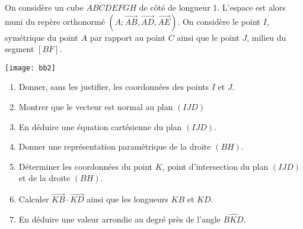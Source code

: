 \documentclass[11pt,fleqn, openany]{book} %
\begin{document}
\begin{exercise}
On considère un cube $ABCDEFGH$ de côté de longueur 1. L'espace est alors muni du repère orthonormé $(A;\overrightarrow{AB},\overrightarrow{AD},\overrightarrow{AE})$.
On considère le point $I$, symétrique du point $A$ par rapport au point $C$ ainsi que le point $J$, milieu du segment $[BF]$.

\begin{center}\texttt{[image: bb2]}\end{center}

\begin{enumerate}
    \item Donner, sans les justifier, les coordonnées des points $I$ et $J$.
    \item Montrer que le vecteur  est normal au plan $(IJD)$
    \item En déduire une équation cartésienne du plan $(IJD)$.
    \item Donner une représentation paramétrique de la droite $(BH)$.
    \item Déterminer les coordonnées du point $K$, point d'intersection du plan $(IJD)$ et de la droite $(BH)$.
    \item Calculer $\overrightarrow{KB}\cdot \overrightarrow{KD}$ ainsi que les longueurs $KB$ et $KD$.
    \item En déduire une valeur arrondie au degré près de l'angle $\widehat{BKD}$.
\end{enumerate}
\newpage
\end{exercise}
\end{document}
